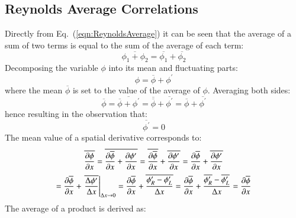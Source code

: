 \documentclass{warpdoc}
\newcommand{\alb}{\vspace{0.2cm}\\} %
\newcommand{\mfd}{\displaystyle}
\begin{document}
\subsection{Reynolds Average Correlations}

Directly from Eq.\ (\ref{eqn:ReynoldsAverage}) it can be seen that the
average of a sum of two terms is equal to the sum of the average
of each term:
%
\begin{equation}
  \overline{\phi_1+\phi_2}=\overline{\phi_1}+\overline{\phi_2}
  \label{eqn:Average_Sum}
\end{equation}
%
Decomposing the variable $\phi$ into its mean and fluctuating parts:
%
\begin{equation}
  \phi=\overline{\phi}+\phi^{\prime}
\end{equation}
%
where the mean $\overline{\phi}$ is set to the value of the  average of $\phi$.
Averaging both sides:
%
\begin{equation}
  \overline{\phi} = \overline{\overline{\phi}+\phi^{\prime}}
                  = \overline{\overline{\phi}}+\overline{\phi^{\prime}}
                  = \overline{\phi}+\overline{\phi^{\prime}}
\end{equation}
%
hence resulting in the observation that:
%
\begin{equation}
  \overline{\phi^{\prime}}=0
\end{equation}
%
The mean value of a spatial derivative corresponds to:
%
\begin{equation}
  \begin{array}{c}
  \mfd\overline{\frac{\partial \phi}{\partial x} }
     = \overline{\frac{\partial \overline{\phi}}{\partial x} + \frac{\partial \phi^{\prime}}{\partial x}}
     = \overline{\frac{\partial \overline{\phi}}{\partial x}} + \overline{\frac{\partial \phi^{\prime}}{\partial x}}
     = \frac{\partial \overline{\phi}}{\partial x} + \overline{\frac{\partial \phi^{\prime}}{\partial x}}
    \alb
  \mfd = \frac{\partial \overline{\phi}}{\partial x} + \left. \overline{\frac{\Delta \phi^{\prime}}{\Delta x}} \right|_{\Delta x \rightarrow 0}
     = \frac{\partial \overline{\phi}}{\partial x} + \overline{\frac{ \phi^{\prime}_R-\phi^{\prime}_L}{\Delta x}}
     = \frac{\partial \overline{\phi}}{\partial x} + \frac{ \overline{\phi^{\prime}_R}-\overline{\phi^{\prime}_L}}{\Delta x}
     = \frac{\partial \overline{\phi}}{\partial x}
  \end{array}
\end{equation}
%
The  average of a product is derived as:
%
\end{document}
